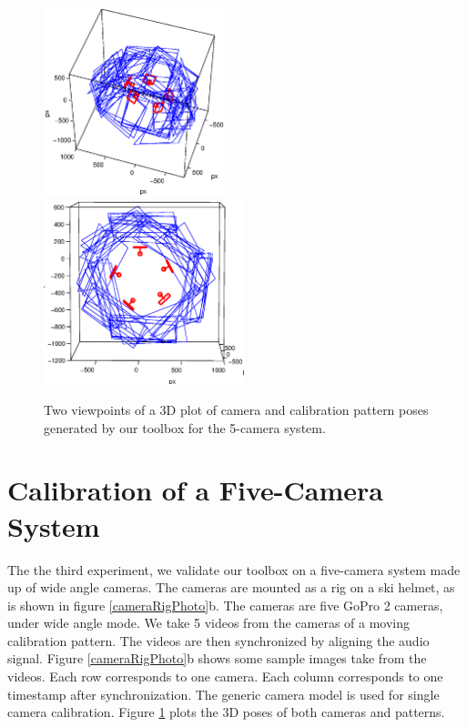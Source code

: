 \documentclass{report}
\begin{document}
\begin{figure}
\centering 
\includegraphics[trim=0.4in 0in 0.4in 0.0in, clip=true, width=0.47\textwidth]{images/5rig2} 
\includegraphics[trim=0.1in 0in 0.4in 0.5in, clip=true, width=0.52\textwidth]{images/5rig1} 
\caption{Two viewpoints of a 3D plot of camera and calibration pattern poses generated by our toolbox for the 5-camera system. } 
\label{fiveCameraRigPlot}
\end{figure}

\section{Calibration of a Five-Camera System}
The the third experiment, we validate our toolbox on a five-camera system made up of wide angle cameras. The cameras are mounted as a rig on a ski helmet, as is shown in figure \ref{cameraRigPhoto}b. The cameras are five GoPro 2 cameras, under wide angle mode. We take 5 videos from the cameras of a moving calibration pattern. The videos are then synchronized by aligning the audio signal. Figure \ref{cameraRigPhoto}b shows some sample images take from the videos. Each row corresponds to one camera. Each column corresponds to one timestamp after synchronization. The generic camera model is used for single camera calibration. Figure \ref{fiveCameraRigPlot} plots the 3D poses of both cameras and patterns. 
\end{document}
